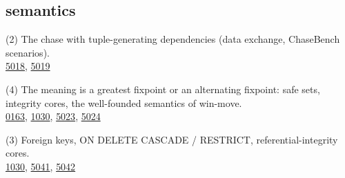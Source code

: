\documentclass[10pt]{article}
\begin{document}
\subsection*{semantics}
\begin{description}[leftmargin=1.2em,itemsep=2pt]
\item[\texttt{chase}\label{tag:chase}] (2) The chase with tuple-generating dependencies (data exchange, ChaseBench scenarios).\\ {\small \hyperref[case:Example5018]{5018}, \hyperref[case:Example5019]{5019}}
\item[\texttt{greatest-fixpoint}\label{tag:greatest-fixpoint}] (4) The meaning is a greatest fixpoint or an alternating fixpoint: safe sets, integrity cores, the well-founded semantics of win-move.\\ {\small \hyperref[case:Example0163]{0163}, \hyperref[case:Example1030]{1030}, \hyperref[case:Example5023]{5023}, \hyperref[case:Example5024]{5024}}
\item[\texttt{integrity-constraints}\label{tag:integrity-constraints}] (3) Foreign keys, ON DELETE CASCADE / RESTRICT, referential-integrity cores.\\ {\small \hyperref[case:Example1030]{1030}, \hyperref[case:Example5041]{5041}, \hyperref[case:Example5042]{5042}}
\end{description}
\end{document}
